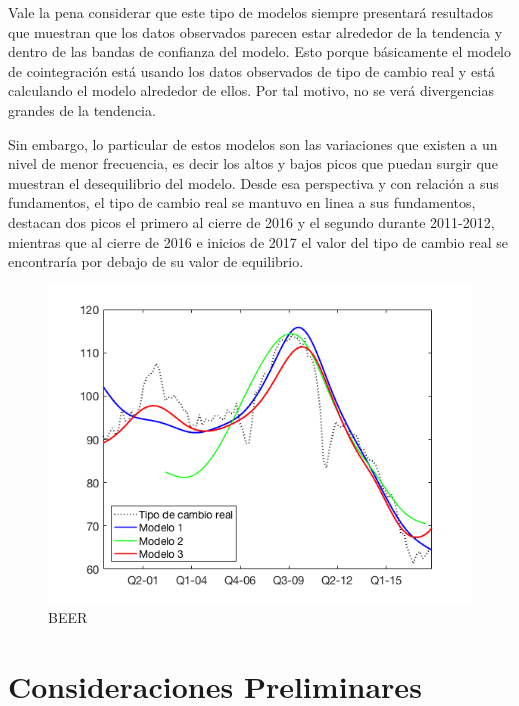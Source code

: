 \documentclass[12pt,letterpaper]{article}
\begin{document}
Vale la pena considerar que este tipo de modelos siempre presentará resultados que muestran que los datos observados parecen estar alrededor de la tendencia y dentro de las bandas de confianza del modelo. Esto porque básicamente el modelo de cointegración está usando los datos observados de tipo de cambio real y está calculando el modelo alrededor de ellos. Por tal motivo, no se verá divergencias grandes de la tendencia.

Sin embargo, lo particular de estos modelos son las variaciones que existen a un nivel de menor frecuencia, es decir los altos y bajos picos que puedan surgir que muestran el desequilibrio del modelo. Desde esa perspectiva y con relación a sus fundamentos, el tipo de cambio real se mantuvo en linea a sus fundamentos, destacan dos picos el primero al cierre de 2016 y el segundo durante 2011-2012, mientras que al cierre de 2016 e inicios de 2017 el valor del tipo de cambio real se encontraría por debajo de su valor de equilibrio.   


\begin{center}
\begin{figure}
\caption{BEER}
\includegraphics[width=\textwidth]{fig19}
\end{figure}
\end{center}


\section{Consideraciones Preliminares}\label{consid}
\end{document}

